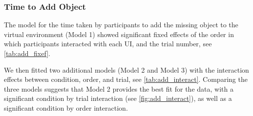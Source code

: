\documentclass[letterpaper, 10 pt, conference]{ieeeconf}  %
\begin{document}


\subsubsection{Time to Add Object}
The model for the time taken by participants to add the missing object to the virtual environment (Model 1) showed significant fixed effects of the order in which participants interacted with each UI, and the trial number, see \cref{tab:add_fixef}.

\begin{table}[b]
    \centering
    \footnotesize
    \caption{Fixed Effects for Time to Add Missing Object}
    \end{table}


We then fitted two additional models (Model 2 and Model 3) with the interaction effects between condition, order, and trial, see \cref{tab:add_interact}. Comparing the three models suggests that Model 2 provides the best fit for the data, with a significant condition by trial interaction (see \cref{fig:add_interact}), as well as a significant condition by order interaction. 
\end{document}
